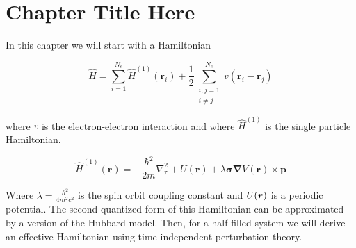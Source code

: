 \chapter{Chapter Title Here} %

In this chapter we will start with a Hamiltonian

\begin{equation}
\label{Ham1}
\hat{H} = \sum_{i=1}^{N_e} \hat{H}^{(1)}(\textbf{r}_i) + \frac{1}{2} \sum_{\substack{i,j = 1 \\ i \neq j}} ^ {N_e} v(\textbf{r}_i - \textbf{r}_j)
\end{equation}

where $v$ is the electron-electron interaction and where $\hat{H}^{(1)}$ is the single particle Hamiltonian.

\begin{equation}
\hat{H}^{(1)}(\textbf{r}) = -\frac{\hbar^2}{2m}\nabla^2_{\textbf{r}} + U(\textbf{r}) + \lambda\boldsymbol{\sigma}\boldsymbol{\nabla}V(\textbf{r}) \times \textbf{p}
\end{equation}

Where $\lambda = \frac{\hbar^2}{4m^2c^2}$ is the spin orbit coupling constant and $U(\boldsymbol{r})$ is a periodic potential. The second quantized form of this Hamiltonian can be approximated by a version of the Hubbard model. Then, for a half filled system we will derive an effective Hamiltonian using time independent perturbation theory.


